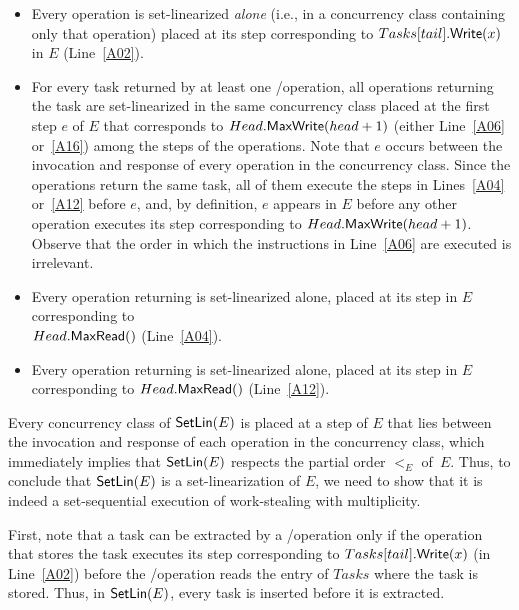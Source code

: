 \begin{thesisproof}
\begin{itemize}

\item Every \Put operation is set-linearized \emph{alone} (i.e., in a concurrency class containing only that operation) placed at its step corresponding to \(Tasks[tail].{\sf \small Write}(x)\) in \(E\) (Line~\ref{A02}).

\item For every task returned by at least one \Take/\Steal operation, all operations returning the task are set-linearized in the same concurrency class placed at the first step \(e\) of \(E\) that corresponds to \(Head.{\sf \small MaxWrite}(head+1)\) (either Line~\ref{A06} or~\ref{A16}) among the steps of the operations. Note that \(e\) occurs between the invocation and response of every operation in the concurrency class. Since the operations return the same task, all of them execute the \MaxR steps in Lines~\ref{A04} or~\ref{A12} before \(e\), and, by definition, \(e\) appears in \(E\) before any other operation executes its step corresponding to \(Head.{\sf \small MaxWrite}(head+1)\). Observe that the order in which the instructions in Line~\ref{A06} are executed is irrelevant.

\item Every \Take operation returning \epty is set-linearized alone, placed at its step in \(E\) corresponding to\\ \(Head.{\sf \small MaxRead}()\) (Line~\ref{A04}).

\item Every \Steal operation returning \epty is set-linearized alone, placed at its step in \(E\) corresponding to \(Head.{\sf \small MaxRead}()\) (Line~\ref{A12}).

\end{itemize}

Every concurrency class of \({\sf \small SetLin}(E)\) is placed at a step of \(E\) that lies between the invocation and response of each operation in the concurrency class, which immediately implies that \({\sf \small SetLin}(E)\) respects the partial order \(<_E\) of~\(E\). Thus, to conclude that \({\sf \small SetLin}(E)\) is a set-linearization of \(E\), we need to show that it is indeed a set-sequential execution of work-stealing with multiplicity.

First, note that a task can be extracted by a \Take/\Steal operation only if the \Put operation that stores the task executes its step corresponding to \(Tasks[tail].{\sf \small Write}(x)\) (in Line~\ref{A02}) before the \Take/\Steal operation reads the entry of \(Tasks\) where the task is stored. Thus, in \({\sf \small SetLin}(E)\), every task is inserted before it is extracted.


\end{thesisproof}
